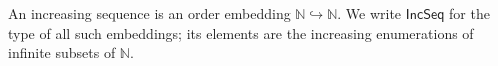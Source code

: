 \begin{definition}
An increasing sequence is an order embedding $\mathbb N\hookrightarrow
\mathbb N$.  We write $\mathsf{IncSeq}$ for the type of all such embeddings;
its elements are the increasing enumerations of infinite subsets of
$\mathbb N$.
\end{definition}
